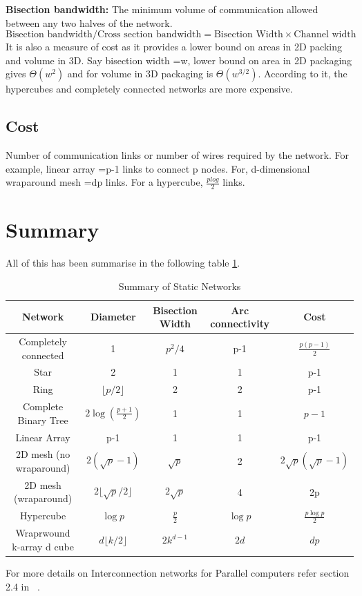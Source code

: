 \documentclass[12pt]{book}
\begin{document}
\textbf{Bisection bandwidth: }The minimum volume of communication allowed between any two halves of the network.
\begin{equation}
    \text{Bisection bandwidth/Cross section bandwidth} = \text{Bisection Width} \times \text{Channel width}
\end{equation}
It is also a measure of cost as it provides a lower bound on areas in 2D packing and volume in 3D.
Say bisection width =w, lower bound on area in 2D packaging gives $\Theta(w^2)$ and for volume in 3D packaging is $\Theta(w^{3/2})$.
According to it, the hypercubes and completely connected networks are more expensive.

\subsection{Cost}
Number of communication links or number of wires required by the network.
For example, linear array =p-1 links to connect p nodes. For, d-dimensional wraparound mesh =dp links.
For a hypercube, $\frac{plog}{2}$ links. 

\section{Summary}
All of this has been summarise in the following table \ref{tab:static_network}. 
\begin{table}[H]
    \centering
    \begin{tabular}{|c|c|c|c|c|}
        \hline
        Network & Diameter & Bisection Width & Arc connectivity & Cost  \\
        \hline
        Completely connected & 1 & $p^2/4$ & p-1 & $\frac{p(p-1)}{2}$ \\
        Star & 2 & 1 & 1 & p-1 \\
        Ring & $\lfloor p/2 \rfloor$ & 2 & 2 & p-1 \\
        Complete Binary Tree & $2\log(\frac{p+1}{2})$ & 1 & 1 & $p-1$ \\
        Linear Array & p-1 & 1 & 1 & p-1 \\
        2D mesh (no wraparound) & $2(\sqrt{p}-1)$ & $\sqrt{p}$ & 2 & $2\sqrt{p}(\sqrt{p}-1)$ \\
        2D mesh (wraparound) & $2\lfloor\sqrt{p}/2\rfloor$ & $2\sqrt{p}$ & 4 & 2p \\
        Hypercube & $\log p$ & $\frac{p}{2}$ & $\log p$ & $\frac{p \log p}{2}$ \\
        Wraprwound k-array d cube & $d \lfloor k/2\rfloor$ & $2k^{d-1}$ & $2d$ & $dp$ \\ 
        \hline
    \end{tabular}
    \caption{Summary of Static Networks}
    \label{tab:static_network}
\end{table}
For more details on Interconnection networks for Parallel computers refer section 2.4 in ~\cite{kumar1994introduction}. 
\end{document}
